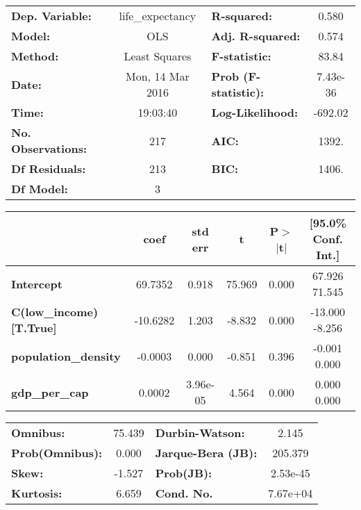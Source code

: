 \begin{center}
\begin{tabular}{lclc}
\toprule
\textbf{Dep. Variable:}        & life_expectancy  & \textbf{  R-squared:         } &     0.580   \\
\textbf{Model:}                &       OLS        & \textbf{  Adj. R-squared:    } &     0.574   \\
\textbf{Method:}               &  Least Squares   & \textbf{  F-statistic:       } &     83.84   \\
\textbf{Date:}                 & Mon, 14 Mar 2016 & \textbf{  Prob (F-statistic):} &  7.43e-36   \\
\textbf{Time:}                 &     19:03:40     & \textbf{  Log-Likelihood:    } &   -692.02   \\
\textbf{No. Observations:}     &         217      & \textbf{  AIC:               } &     1392.   \\
\textbf{Df Residuals:}         &         213      & \textbf{  BIC:               } &     1406.   \\
\textbf{Df Model:}             &           3      & \textbf{                     } &             \\
\bottomrule
\end{tabular}
\begin{tabular}{lccccc}
                               & \textbf{coef} & \textbf{std err} & \textbf{t} & \textbf{P$>$$|$t$|$} & \textbf{[95.0\% Conf. Int.]}  \\
\midrule
\textbf{Intercept}             &      69.7352  &        0.918     &    75.969  &         0.000        &        67.926    71.545       \\
\textbf{C(low_income)[T.True]} &     -10.6282  &        1.203     &    -8.832  &         0.000        &       -13.000    -8.256       \\
\textbf{population_density}    &      -0.0003  &        0.000     &    -0.851  &         0.396        &        -0.001     0.000       \\
\textbf{gdp_per_cap}           &       0.0002  &     3.96e-05     &     4.564  &         0.000        &         0.000     0.000       \\
\bottomrule
\end{tabular}
\begin{tabular}{lclc}
\textbf{Omnibus:}       & 75.439 & \textbf{  Durbin-Watson:     } &    2.145  \\
\textbf{Prob(Omnibus):} &  0.000 & \textbf{  Jarque-Bera (JB):  } &  205.379  \\
\textbf{Skew:}          & -1.527 & \textbf{  Prob(JB):          } & 2.53e-45  \\
\textbf{Kurtosis:}      &  6.659 & \textbf{  Cond. No.          } & 7.67e+04  \\
\bottomrule
\end{tabular}
\end{center}
